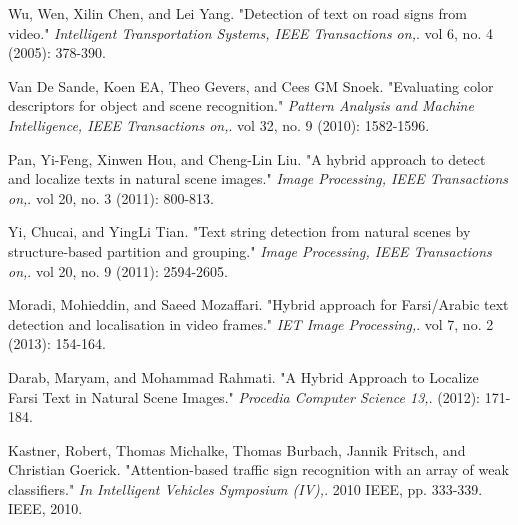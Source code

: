 \documentclass[12pt,a4paper]{article}
\theoremstyle{definition}
\theoremstyle{theorem}
\theoremstyle{definition}
\begin{document}
\begin{thebibliography}{99}
\begin{LTRitems}
Wu, Wen, Xilin Chen, and Lei Yang. "Detection of text on road signs from video." {\em Intelligent Transportation Systems, IEEE Transactions on,}. vol 6, no. 4 (2005): 378-390.

Van De Sande, Koen EA, Theo Gevers, and Cees GM Snoek. "Evaluating color descriptors for object and scene recognition." {\em Pattern Analysis and Machine Intelligence, IEEE Transactions on,}. vol 32, no. 9 (2010): 1582-1596.

Pan, Yi-Feng, Xinwen Hou, and Cheng-Lin Liu. "A hybrid approach to detect and localize texts in natural scene images." {\em Image Processing, IEEE Transactions on,}. vol 20, no. 3 (2011): 800-813. 

Yi, Chucai, and YingLi Tian. "Text string detection from natural scenes by structure-based partition and grouping." {\em Image Processing, IEEE Transactions on,}. vol 20, no. 9 (2011): 2594-2605.

Moradi, Mohieddin, and Saeed Mozaffari. "Hybrid approach for Farsi/Arabic text detection and localisation in video frames." {\em IET Image Processing,}. vol 7, no. 2 (2013): 154-164.

Darab, Maryam, and Mohammad Rahmati. "A Hybrid Approach to Localize Farsi Text in Natural Scene Images." {\em Procedia Computer Science 13,}. (2012): 171-184.

Kastner, Robert, Thomas Michalke, Thomas Burbach, Jannik Fritsch, and Christian Goerick. "Attention-based traffic sign recognition with an array of weak classifiers." {\em In Intelligent Vehicles Symposium (IV),}. 2010 IEEE, pp. 333-339. IEEE, 2010.

\end{LTRitems}

\end{thebibliography}
\end{document}
